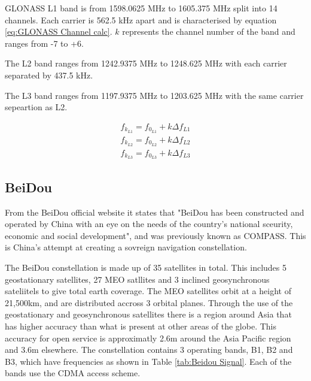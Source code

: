 GLONASS L1 band is from 1598.0625 MHz to 1605.375 MHz split into 14 channels. Each carrier is 562.5 kHz apart and is characterised by equation \ref{eq:GLONASS Channel
calc}. $k$ represents the channel number of the band and ranges from -7 to +6. 

The L2 band ranges from 1242.9375 MHz to 1248.625 MHz with each carrier separated by 437.5 kHz.

The L3 band ranges from 1197.9375 MHz to 1203.625 MHz with the same carrier sepeartion as L2.

\begin{equation} 
    \begin{split} \label{eq:GLONASS Channel calc}
        f_{k_{L1}} = f_{0_{L1}} + k \Delta f_{L1} \\ 
        f_{k_{L2}} = f_{0_{L2}} + k \Delta f_{L2} \\ 
        f_{k_{L3}} = f_{0_{L3}} + k \Delta f_{L3}
    \end{split}
\end{equation}

\subsection{BeiDou} \label{subsec:GNSS_BeiDouIntro}
From the BeiDou official website it states that "BeiDou has been constructed and operated by China with an eye on the needs of the country's national sceurity, economic
and social development", and was previously known as COMPASS. This is China's attempt at creating a sovreign navigation constellation.

The BeiDou constellation is made up of 35 satellites in total. This includes 5 geostationary satellites, 27 MEO satllites and 3 inclined geosynchronous sateliitels to
give total earth coverage. The MEO satellites orbit at a height of 21,500km, and are distributed accross 3 orbital planes. Through the use of the geostationary and geosynchronous satellites there is a region around Asia that has higher accuracy than what is present
at other areas of the globe. This accuracy for open service is approximatly 2.6m around the Asia Pacific region and 3.6m elsewhere. 
The constellation contains 3 operating bands, B1, B2 and B3, which have frequencies as shown in Table \ref{tab:Beidou Signal}. Each of the bands use the CDMA access scheme.

